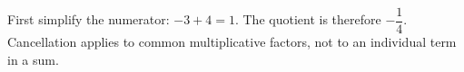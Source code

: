 First simplify the numerator: $-3+4=1$. The quotient is therefore $\boxed{-\dfrac{1}{4}}$. Cancellation applies to common multiplicative factors, not to an individual term in a sum.
